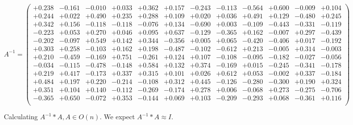 \documentclass[9pt]{article}
\theoremstyle{plain}
\theoremstyle{definition}
\theoremstyle{remark}
\numberwithin{equation}{section}
\begin{document}
$A^{-1} = \left(
\begin{array}{
cccccccccccc}
+0.238 & -0.161 & -0.010 & +0.033 & +0.362 & +0.157 & -0.243 & -0.113 & -0.564 & +0.600 & -0.009 & +0.104 \\
+0.244 & +0.022 & +0.490 & +0.235 & +0.288 & +0.109 & +0.020 & +0.036 & +0.491 & +0.129 & -0.480 & +0.245 \\
+0.342 & +0.156 & -0.118 & -0.118 & -0.076 & +0.134 & -0.690 & +0.003 & -0.109 & -0.443 & -0.331 & -0.119 \\
-0.223 & +0.053 & +0.270 & +0.046 & +0.095 & +0.637 & -0.129 & -0.365 & +0.162 & -0.007 & +0.297 & -0.439 \\
-0.202 & -0.097 & +0.549 & +0.142 & +0.344 & -0.356 & +0.005 & +0.065 & -0.420 & -0.406 & +0.017 & -0.192 \\
+0.303 & +0.258 & -0.103 & +0.162 & +0.198 & -0.487 & -0.102 & -0.612 & +0.213 & -0.005 & +0.314 & -0.003 \\
+0.210 & -0.459 & -0.169 & +0.751 & -0.261 & +0.124 & +0.107 & -0.108 & -0.095 & -0.182 & -0.027 & -0.056 \\
-0.034 & -0.115 & -0.478 & -0.148 & +0.584 & +0.132 & +0.374 & -0.169 & +0.015 & -0.245 & -0.341 & -0.178 \\
+0.219 & +0.417 & -0.173 & +0.337 & +0.315 & +0.101 & +0.026 & +0.612 & +0.053 & -0.002 & +0.337 & -0.184 \\
+0.484 & +0.197 & +0.220 & -0.214 & -0.108 & +0.312 & +0.445 & -0.126 & -0.280 & -0.300 & +0.190 & +0.324 \\
+0.351 & +0.104 & +0.140 & -0.112 & -0.269 & -0.174 & +0.278 & +0.006 & -0.068 & +0.273 & -0.275 & -0.706 \\
-0.365 & +0.650 & -0.072 & +0.353 & -0.144 & +0.069 & +0.103 & -0.209 & -0.293 & +0.068 & -0.361 & +0.116 \\
\end{array}
\right)$ \newline 

Calculating $A^{-1} *A  ,  A \in O(n)$.   We expect $A^{-1} *A  \approx I$. 
\end{document}
